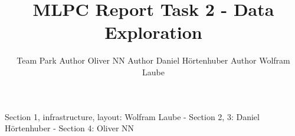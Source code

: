 \documentclass{article}
\title{MLPC Report Task 2 - Data Exploration}
\author{%
  Team Park \AND
  Author Oliver NN
  \And
  Author Daniel Hörtenhuber
  \And 
  Author Wolfram Laube
}
\begin{document}
\maketitle


\begin{contributions}
  Section 1, infrastructure, layout: Wolfram Laube - Section 2, 3: Daniel Hörtenhuber - Section 4: Oliver NN
\end{contributions}








\end{document}
